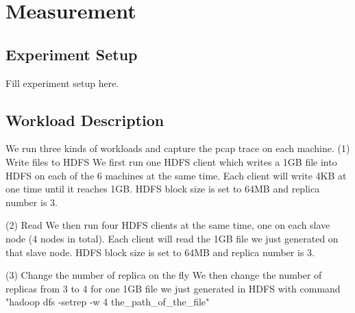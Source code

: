 \section{Measurement}
\label{section:measurement}


\subsection{\bf Experiment Setup}

Fill experiment setup here.

\subsection{\bf Workload Description}
We run three kinds of workloads and capture the pcap trace on each machine.
(1) Write files to HDFS
We first run one HDFS client which writes a 1GB file into HDFS on each of the 6 machines at the same time. Each client will write 4KB at one time until it reaches 1GB. HDFS block size is set to 64MB and replica number is 3.

(2) Read
We then run four HDFS clients at the same time, one on each slave node (4 nodes in total). Each client will read the 1GB file we just generated on that slave node. HDFS block size is set to 64MB and replica number is 3.

(3) Change the number of replica on the fly
We then change the number of replicas from 3 to 4 for one 1GB file we just generated in HDFS with command "hadoop dfs -setrep -w 4 the\_path\_of\_the\_file"



